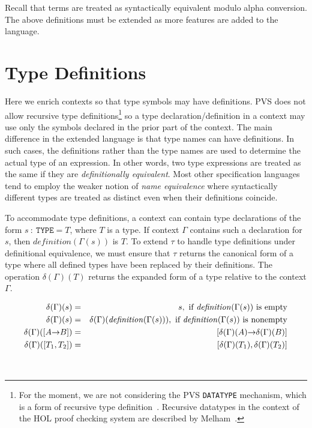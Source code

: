 \documentclass [12pt,twoside]{cslreport}
\newcommand{\thmbox}
   {{\ \hfill\hbox{%
      \vrule width1.0ex height1.0ex
   }\parfillskip 0pt }}
\newcommand{\aro}{\mathord\rightarrow} %
\newcommand{\funtype}[2]{[#1 \aro #2]}
\newcommand{\tupletype}[1]{[#1]}
\newcommand{\listwo}[2]{#1_{1}, #1_{2}}
\newcommand{\itdef}{\textit{definition}}
\newenvironment{Defn}[1]{\begin{definition}[#1]\label{defn:#1}}{
\thmbox\end{definition}}
\begin{document}
Recall that terms are treated as syntactically equivalent modulo
alpha conversion.  
The above definitions must be extended as more 
features are added to the language. 

\section{Type Definitions}


Here we enrich contexts so that type symbols may have definitions.  PVS
does not allow recursive type definitions\footnote{For the moment, we are
not considering the PVS \texttt{DATATYPE} mechanism, which is a form of
recursive type definition~\cite{Shankar:ADT97}.  Recursive datatypes in
the context of the HOL proof checking system are described by
Melham~\cite{Melham89}.}  so a type declaration/definition in a context
may use only the symbols declared in the prior part of the context.  The
main difference in the extended language is that type names can have
definitions.  In such cases, the definitions rather than the type names
are used to determine the actual type of an expression.  In other words,
two type expressions are treated as the same if they are
\emph{definitionally equivalent}\@.  Most other specification languages
tend to employ the weaker notion of \emph{name equivalence} where
syntactically different types are treated as distinct even when their
definitions coincide.

To accommodate type definitions, a context can
contain type declarations of the form $s\ :\ \mathtt{TYPE} = T$, where $T$
is a type.  If context $\Gamma$ contains such a declaration for $s$, then
$ \itdef{}(\Gamma(s))$ is $T$\@.  To extend $\tau$ to handle type
definitions under definitional equivalence, we must ensure that $\tau$
returns the canonical form of a type where all defined types have been
replaced by their definitions.  The operation $\delta(\Gamma)(T)$ returns
the expanded form of a type relative to the context $\Gamma$\@.
%
\begin{Defn}{expanded type}
\begin{eqnarray*}
  \delta(\Gamma)(s) & = & s, \mbox{ if } \textit{definition\/}(\Gamma(s))
\mbox{ is empty}\\
% 
  \delta(\Gamma)(s) & = & \delta(\Gamma)(
\textit{definition\/}(\Gamma(s))), 
\mbox{ if } \textit{definition\/}(\Gamma(s))
\mbox{ is nonempty} \\
%
 \delta(\Gamma)(\funtype{A}{B}) & = &
      \funtype{\delta(\Gamma)(A)}{\delta(\Gamma)(B)} \\
%
 \delta(\Gamma)(\tupletype{\listwo{T}{n}}) & = &
     \tupletype{\delta(\Gamma)(T_1),  \delta(\Gamma)(T_2)}
\end{eqnarray*}
\end{Defn}
\end{document}
